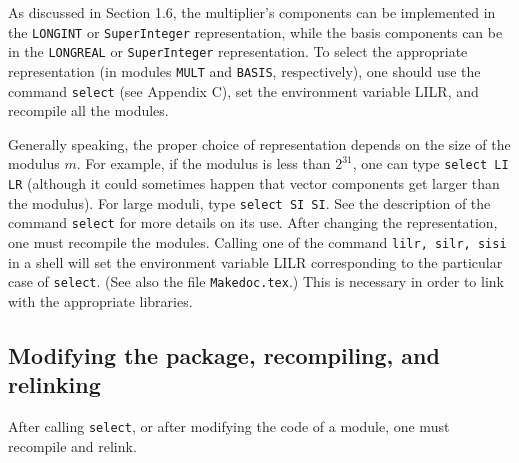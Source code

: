 As discussed in Section 1.6, the multiplier's components can be implemented
in the {\tt LONGINT} or {\tt SuperInteger} representation, while the basis
components can be in the {\tt LONGREAL} or {\tt SuperInteger} representation.
To select the appropriate representation (in modules {\tt MULT} and
{\tt BASIS}, respectively), one should use the command
{\tt select} (see Appendix C), set the environment variable LILR,
 and recompile all the modules.

Generally speaking, the proper choice of representation
depends on the size of the mo\-du\-lus $m$. 
For example, if the modulus is less than $2^{31}$, one can type
{\tt select LI LR} (although it could sometimes happen that vector components
get larger than the modulus).
For large moduli, type {\tt select SI SI}.
See the description of the command {\tt select} for more details on its use.
After changing the representation, one must recompile the modules. 
Calling one of the command {\tt lilr, silr, sisi} in a shell will
set the environment variable LILR corresponding to the particular case
of  {\tt select}. (See also the file {\tt Makedoc.tex}.) This is
necessary in order to link with the appropriate libraries.

\subsection {Modifying the package, recompiling, and relinking}

After calling {\tt select}, or after modifying the code of a module,
one must recompile and relink. 
%
